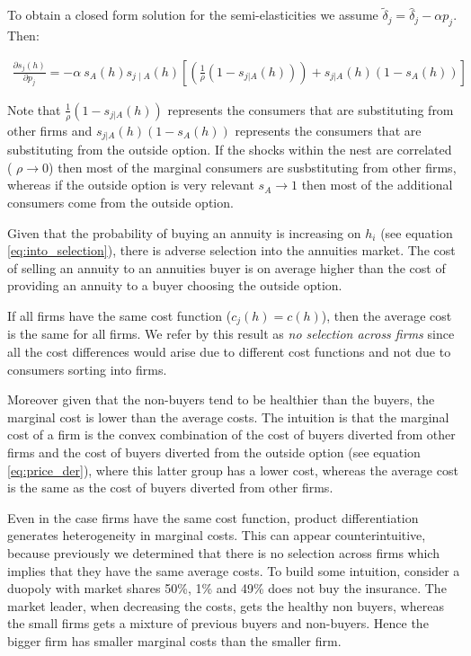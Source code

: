 \documentclass[12pt]{article}
\theoremstyle{plain}
\theoremstyle{plain}
\begin{document}
To obtain a closed form solution for the semi-elasticities we assume  $\tilde{\delta}_j = \hat{\delta}_j - \alpha p_j$. Then: 

\begin{align}\label{eq:price_der}
    \frac{\partial s_j(h)}{\partial p_j} 
    = -\alpha \ s_A(h) s_{j\mid A}(h) \left[ \left(\frac{1}{\rho}(1-s_{j|A}(h))\right)  + s_{j|A}(h)  (1-s_A(h)) \right]  
\end{align}



Note that $\frac{1}{\rho}(1-s_{j|A}(h))$ represents the consumers that are substituting from other firms and $s_{j|A}(h)  (1-s_A(h))$ represents the consumers that are substituting from the outside option. 
If the shocks within the nest are correlated ( $\rho \rightarrow 0 $) then most of the marginal consumers are susbstituting from other firms, whereas if the outside option is very relevant $s_A \rightarrow 1 $ then most of the additional consumers come from the outside option. 


Given that the  probability of buying an annuity is increasing on $h_i$ (see equation \ref{eq:into_selection}), there is adverse selection into the annuities market. The cost of selling an annuity to an annuities buyer is on average higher than the cost of providing an annuity to a buyer choosing the outside option.

If all firms have the same cost function ($c_j(h) = c(h)$), then the average cost is the same for all firms. We refer by this result as \textit{no selection across firms} since all the cost differences would arise due to different cost functions and not due to consumers sorting into firms. 

Moreover given that the non-buyers tend to be healthier than the buyers, the marginal cost is lower than the average costs. The intuition is that the marginal cost of a firm is the convex combination of the cost of buyers diverted from other firms and the cost of  buyers diverted from the outside option (see equation \ref{eq:price_der}), where this latter group has a lower cost, whereas the average cost is the same as the cost of buyers diverted from other firms.  


Even in the case firms have the same cost function, product differentiation generates  heterogeneity in marginal costs. This can appear counterintuitive, because previously we determined that there is no selection across firms which implies that they have the same average costs. To build some intuition, consider a duopoly with market shares 50\%, 1\% and 49\% does not buy the insurance. The market leader, when decreasing the costs, gets the healthy non buyers, whereas the small firms gets a mixture of previous buyers and non-buyers. Hence the bigger firm has smaller marginal costs than the smaller firm. 
\end{document}
